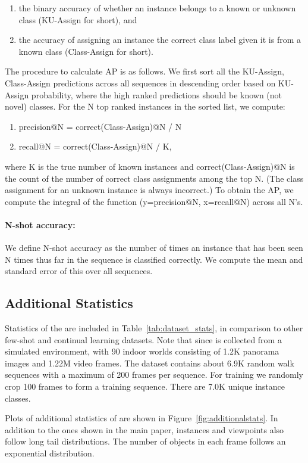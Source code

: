 \begin{enumerate}
    \item the binary accuracy of whether an instance belongs to a known or unknown class (KU-Assign for short), and
    \item the accuracy of assigning an instance the correct class label given it is from a known class (Class-Assign for short).
\end{enumerate}
The procedure to calculate AP is as follows. We first sort all the {KU-Assign, Class-Assign} predictions across all sequences in descending order based on KU-Assign probability, where the high ranked predictions should be known (not novel) classes. For the N top ranked instances in the sorted list, we compute:
\begin{enumerate}
    \item precision@N = correct(Class-Assign)@N / N
    \item recall@N = correct(Class-Assign)@N / K,
\end{enumerate}
where K is the true number of known instances and correct(Class-Assign)@N is the count of the number of correct class assignments among the top N. (The class assignment for an unknown instance is always incorrect.) To obtain the AP, we compute the integral of the function (y=precision@N, x=recall@N) across all N’s.

\paragraph{N-shot accuracy:} We define N-shot accuracy as the number of times an instance that has been seen N times thus far in the sequence is classified correctly. We compute the mean and standard error of this over all sequences.

\subsection{Additional \ourroom{} Statistics} 
Statistics of the \ourroom{} are included in Table~\ref{tab:dataset_stats}, in comparison to other
few-shot and continual learning datasets. Note that since \ourroom{} is collected from a simulated
environment, with 90 indoor worlds consisting of 1.2K panorama images and 1.22M video frames. The
dataset contains about 6.9K random walk sequences with a maximum of 200 frames per sequence. For
training we randomly crop 100 frames to form a training sequence. There are 7.0K unique instance
classes.

Plots of additional statistics of \ourroom{} are shown in Figure~\ref{fig:additionalstats}. In
addition to the ones shown in the main paper, instances and viewpoints also follow long tail
distributions. The number of objects in each frame follows an exponential distribution.

